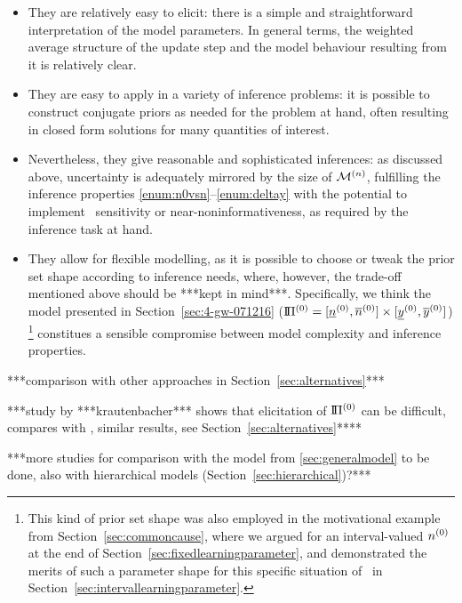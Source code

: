 \begin{itemize}
\item They are relatively easy to elicit:
there is a simple and straightforward interpretation of the model parameters.
In general terms, the weighted average structure of the update step and the model behaviour resulting from it is relatively clear.
\item They are easy to apply in a variety of inference problems:
it is possible to construct conjugate priors as needed for the problem at hand,
often resulting in closed form solutions for many quantities of interest.
\item Nevertheless, they give reasonable and sophisticated inferences:
as discussed above, uncertainty is adequately mirrored by the size of $\mathcal{M}^{(n)}$,
fulfilling the inference properties \ref{enum:n0vsn}--\ref{enum:deltay}
with the potential to implement \pdc\ sensitivity or near-noninformativeness,
as required by the inference task at hand.
\item They allow for flexible modelling, as
it is possible to choose or tweak the prior set shape according to inference needs,
where, however, the trade-off mentioned above should be ***kept in mind***.
Specifically, we think the model presented in Section~\ref{sec:4-gw-071216}
($\text{I}\!\Pi^{(0)} = [\underline{n}^{(0)}, \overline{n}^{(0)}] \times [\underline{y}^{(0)}, \overline{y}^{(0)}]$)%
\footnote{This kind of prior set shape was also employed in the motivational example
from Section~\ref{sec:commoncause}, where we argued for an interval-valued $n^{(0)}$
at the end of Section~\ref{sec:fixedlearningparameter},
and demonstrated the merits of such a parameter shape for this specific situation of \pdc\
in Section~\ref{sec:intervallearningparameter}.}
constitues a sensible compromise between model complexity and inference properties.
\end{itemize}



***comparison with other approaches in Section~\ref{sec:alternatives}***

***study by ***krautenbacher*** shows that elicitation of $\text{I}\!\Pi^{(0)}$ can be difficult,
compares with \textcite{2005:whitcomb}, similar results, see Section~\ref{sec:alternatives}****

***more studies for comparison with the model from \ref{sec:generalmodel} to be done,
also with hierarchical models (Section~\ref{sec:hierarchical})?***

